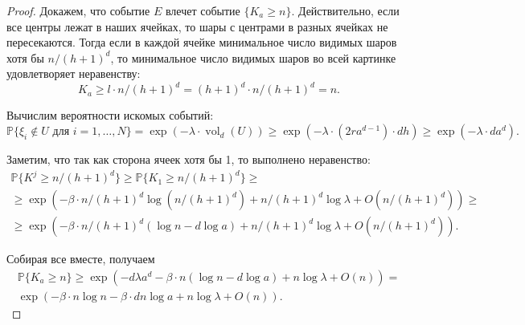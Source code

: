 \documentclass[12pt]{article}
\theoremstyle{plain}
\theoremstyle{definition}
\theoremstyle{remark}
\def\geq{\geqslant}
\DeclareMathOperator{\vol}{vol}
\newcommand{\PP}{\mathbb{P}}
\begin{document}
\begin{proof}
Докажем, что событие $E$ влечет событие $\{K_a \geq n\}$. Действительно, если все центры лежат в наших ячейках, то шары с центрами в разных ячейках не пересекаются. Тогда если в каждой ячейке минимальное число видимых шаров хотя бы $n/(h+1)^d$, то минимальное число видимых шаров во всей картинке удовлетворяет неравенству:
\begin{equation*}
    K_a \geq l\cdot n/(h+1)^d = (h+1)^d \cdot n/(h+1)^d  = n.
\end{equation*}{}

Вычислим вероятности искомых событий:
\begin{equation*}
    \PP\{\xi_i \not\in U \text{ для } i = 1, \ldots, N\} =\exp(-\lambda\cdot\vol_d(U)) \geq \exp(-\lambda\cdot (2ra^{d-1}) \cdot dh) \geq \exp(-\lambda\cdot da^d).
\end{equation*}{}

Заметим, что так как сторона ячеек хотя бы 1, то выполнено неравенство:
\begin{multline*}
    \PP\{K^j \geq n/(h+1)^d\} \geq 
    \PP\{K_1 \geq n/(h+1)^d\} \geq\\ 
    \geq \exp \left(-\beta\cdot n/(h+1)^d\log (n/(h+1)^d) + n/(h+1)^d\log\lambda + O(n/(h+1)^d)\right) \geq\\
    \geq \exp \left(-\beta\cdot n/(h+1)^d(\log n - d\log a) + n/(h+1)^d\log\lambda + O(n/(h+1)^d)\right).
\end{multline*}{}

Собирая все вместе, получаем 
\begin{multline*}
    \PP\{K_a \geq n\} \geq \exp \left(-d\lambda a^d-\beta\cdot n(\log n - d\log a) + n\log\lambda + O(n)\right) = \\
    \exp \left(-\beta\cdot n\log n - \beta\cdot dn\log a + n\log\lambda + O(n)\right).
\end{multline*}{}
\end{proof}{}
\end{document}
